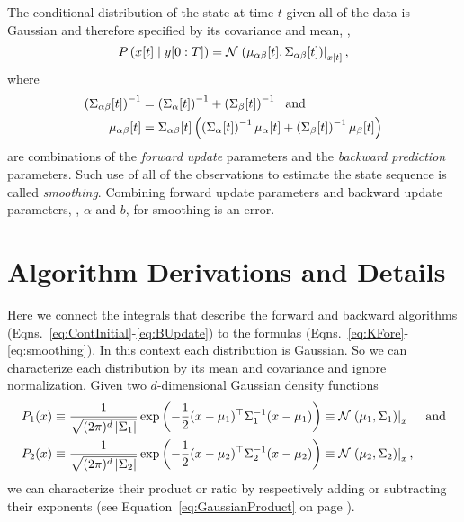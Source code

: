 The conditional distribution of the state at time $t$ given all of the
data is Gaussian and therefore specified by its covariance and mean, \ie,
\begin{equation*}
   P \left({x}{[t]}\mid y[0:T] \right) = {\mathcal{N}}\left.\left({\mu_{\alpha
   \beta}}{[t]},{\Sigma_{\alpha \beta}}{[t]}\right)\right|_{{x}{[t]}},
\end{equation*}
where
\begin{subequations}
  \label{eq:smoothing}
  \begin{align}
    \left( {\Sigma_{\alpha \beta}}{[t]} \right)^{-1} &= \left(
      {\Sigma_{\alpha}}{[t]} \right)^{-1} + \left(
      {\Sigma_{\beta}}{[t]} \right)^{-1} ~\text{ and} \\
    {\mu_{\alpha \beta}}{[t]} &=
    {\Sigma_{\alpha \beta}}{[t]} \left( \left(
        {\Sigma_{\alpha}}{[t]} \right)^{-1} {\mu_{\alpha}}{[t]} +
      \left( {\Sigma_{\beta}}{[t]} \right)^{-1} {\mu_{\beta}}{[t]}
    \right)
\end{align}
\end{subequations}
are combinations of the \emph{forward update} parameters and the
\emph{backward prediction} parameters.  Such use of all of the
observations to estimate the state sequence is called
\emph{smoothing}.  Combining forward update parameters and backward
update parameters, \ie, $\alpha$ and $b$, for smoothing is an error.

\section{Algorithm Derivations and Details}
\label{sec:KDerive}

Here we connect the integrals that describe the forward and backward
algorithms (Eqns.~\eqref{eq:ContInitial}-\eqref{eq:BUpdate}) to the
formulas (Eqns.~\eqref{eq:KFore}-\eqref{eq:smoothing}).  In this
context each distribution is Gaussian.  So we can characterize each
distribution by its mean and covariance and ignore normalization.
Given two $d$-dimensional Gaussian density functions
\begin{align*}
  P_1(x) &\equiv \frac{1}{\sqrt{(2\pi)^d\left| \Sigma_1 \right|}}\exp \left(-\frac{1}{2}
    (x-\mu_1)^\top \Sigma_1^{-1}(x-\mu_1) \right) \equiv
           {\mathcal{N}}\left.\left(\mu_1,\Sigma_1\right)\right|_{x} &&\text{and} \\
  P_2(x) &\equiv \frac{1}{\sqrt{(2\pi)^d\left| \Sigma_2 \right|}}\exp \left(-\frac{1}{2}
    (x-\mu_2)^\top \Sigma_2^{-1}(x-\mu_2)  \right) \equiv
           {\mathcal{N}}\left.\left(\mu_2,\Sigma_2\right)\right|_{x},
\end{align*}
we can characterize their product or ratio by respectively adding or
subtracting their exponents (see Equation~\eqref{eq:GaussianProduct}
on page \pageref{eq:GaussianProduct}).

